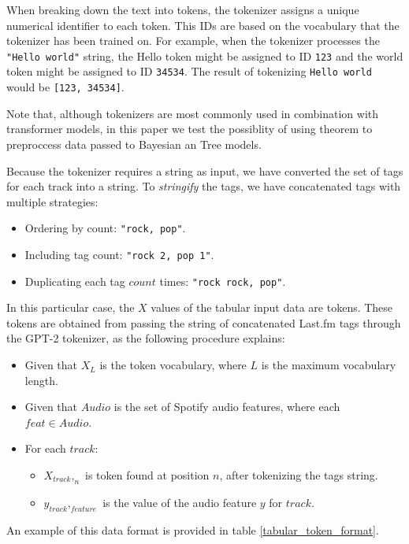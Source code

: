 \documentclass[sn-mathphys]{sn-jnl}%
\theoremstyle{thmstyleone}%
\theoremstyle{thmstyletwo}%
\theoremstyle{thmstylethree}%
\begin{document}
When breaking down the text into tokens, the tokenizer assigns a unique numerical identifier to each token.
This IDs are based on the vocabulary that the tokenizer has been trained on.
For example, when the tokenizer processes the \verb|"Hello world"| string, the Hello token might be assigned to ID \verb|123|
and the world token might be assigned to ID \verb|34534|.
The result of tokenizing \verb|Hello world| would be \verb|[123, 34534]|.

Note that, although tokenizers are most commonly used in combination with transformer models, in this paper we test the possiblity of using theorem
to preproccess data passed to Bayesian an Tree models.

Because the tokenizer requires a string as input, we have converted the set of tags for each track into a string.
To \emph{stringify} the tags, we have concatenated tags with multiple strategies:

\begin{itemize}
      \item Ordering by count: \verb|"rock, pop"|.
      \item Including tag count: \verb|"rock 2, pop 1"|.
      \item Duplicating each tag $count$ times: \verb|"rock rock, pop"|.
\end{itemize}


In this particular case, the $X$ values of the tabular input data are tokens.
These tokens are obtained from passing the string of concatenated Last.fm tags through the GPT-2 tokenizer,
as the following procedure explains:

\begin{itemize}
      \item Given that $X_L$ is the token vocabulary, where $L$ is the maximum vocabulary length.
      \item Given that $Audio$ is the set of Spotify audio features, where each $feat \in Audio$.
      \item For each $track$:
      \begin{itemize}
            \item $X_{track},_{n}$ is token found at position $n$, after tokenizing the tags string.
            \item $y_{track},_{feature}$ is the value of the audio feature $y$ for $track$.
      \end{itemize}
\end{itemize}

An example of this data format is provided in table \ref{tabular_token_format}.
\end{document}

